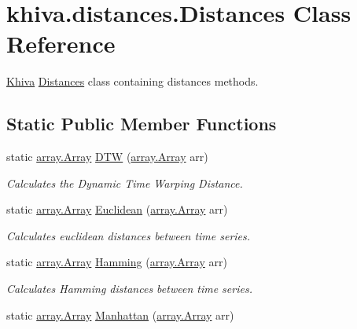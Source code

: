 \hypertarget{classkhiva_1_1distances_1_1_distances}{}\section{khiva.\+distances.\+Distances Class Reference}
\label{classkhiva_1_1distances_1_1_distances}


\mbox{\hyperlink{classkhiva_1_1_khiva}{Khiva}} \mbox{\hyperlink{classkhiva_1_1distances_1_1_distances}{Distances}} class containing distances methods.  


\subsection*{Static Public Member Functions}
\begin{DoxyCompactItemize}
\item 
static \mbox{\hyperlink{classkhiva_1_1array_1_1_array}{array.\+Array}} \mbox{\hyperlink{classkhiva_1_1distances_1_1_distances_a851cefe60d2daa550bbd3b1e75b9de7a}{D\+TW}} (\mbox{\hyperlink{classkhiva_1_1array_1_1_array}{array.\+Array}} arr)
\begin{DoxyCompactList}\small\item\em Calculates the Dynamic Time Warping Distance. \end{DoxyCompactList}\item 
static \mbox{\hyperlink{classkhiva_1_1array_1_1_array}{array.\+Array}} \mbox{\hyperlink{classkhiva_1_1distances_1_1_distances_af54414ba6d52bf6e17d43e4e7c34cd38}{Euclidean}} (\mbox{\hyperlink{classkhiva_1_1array_1_1_array}{array.\+Array}} arr)
\begin{DoxyCompactList}\small\item\em Calculates euclidean distances between time series. \end{DoxyCompactList}\item 
static \mbox{\hyperlink{classkhiva_1_1array_1_1_array}{array.\+Array}} \mbox{\hyperlink{classkhiva_1_1distances_1_1_distances_a88646f3ee47c7e0d91610d6c27685fee}{Hamming}} (\mbox{\hyperlink{classkhiva_1_1array_1_1_array}{array.\+Array}} arr)
\begin{DoxyCompactList}\small\item\em Calculates Hamming distances between time series. \end{DoxyCompactList}\item 
static \mbox{\hyperlink{classkhiva_1_1array_1_1_array}{array.\+Array}} \mbox{\hyperlink{classkhiva_1_1distances_1_1_distances_a5b30df6dcb8bb413a81040757f453107}{Manhattan}} (\mbox{\hyperlink{classkhiva_1_1array_1_1_array}{array.\+Array}} arr)

\end{DoxyCompactItemize}
